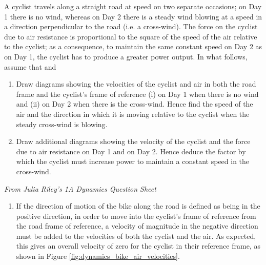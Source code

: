 
\begin{problem} 
{A cyclist travels along a straight road at speed  on two separate occasions; on Day 1 there is no wind, whereas on Day 2 there is a steady wind blowing at a speed  in a direction perpendicular to the road (i.e. a cross-wind). The force on the cyclist due to air resistance is proportional to the square of the speed of the air relative to the cyclist; as a consequence, to maintain the same constant speed  on Day 2 as on Day 1, the cyclist has to produce a greater power output. In what follows, assume that  and 
\begin{enumerate}
\item Draw diagrams showing the velocities of the cyclist and air in both the road frame and the cyclist’s frame of reference (i) on Day 1 when there is no wind and (ii) on Day 2 when there is the cross-wind. Hence find the speed of the air and the
direction in which it is moving relative to the cyclist when the steady cross-wind is blowing.
\item  Draw additional diagrams showing the velocity of the cyclist and the force due to air resistance on Day 1 and on Day 2. Hence deduce the factor by which the cyclist must increase power to maintain a constant speed in the cross-wind.
\end{enumerate}}
{\textit{From Julia Riley's 1A Dynamics Question Sheet}}
{\begin{enumerate}
\item 
If the direction of motion of the bike along the road is defined as being in the positive   direction, in order to move into the cyclist's frame of reference from the road frame of reference, a velocity of magnitude  in the negative  direction must be added to the velocities of both the cyclist and the air. As expected, this gives an overall velocity of zero for the cyclist in their reference frame, as shown in Figure \ref{fig:dynamics_bike_air_velocities}.


\end{enumerate}}
\end{problem}
